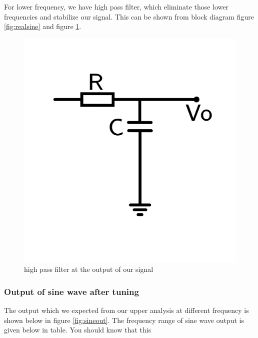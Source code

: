 \documentclass[14pt,a4paper]{extarticle}
\begin{document}
For lower frequency, we have high pass filter, which eliminate those lower frequencies and stabilize our signal. This can be shown from block diagram figure \ref{fig:realsine} and figure \ref{fig:highpass}.


\begin{figure}[h]
\centering
\includegraphics[width=0.3\linewidth]{imgs/highpassfilter2.png}
\caption{high pass filter at the output of our signal}
\label{fig:highpass}
\end{figure}


\subsubsection{Output of sine wave after tuning}
\label{sec:orgb636d31}
The output which we expected from our upper analysis at different frequency is shown below in figure \ref{fig:sineout}. The frequency range of sine wave output is given below in table. You should know that this
\end{document}
